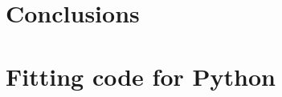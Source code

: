 \documentclass[a4paper, 10pt, nanum]{CSUniSchoolLabReport}
\begin{document}

\section{Conclusions}




\section{Fitting code for Python}




\end{document}
